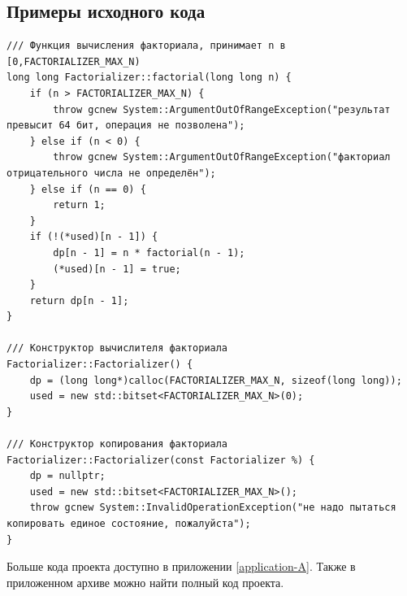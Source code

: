\subsection{Примеры исходного кода}
\begin{verbatim}
/// Функция вычисления факториала, принимает n в [0,FACTORIALIZER_MAX_N)
long long Factorializer::factorial(long long n) {
	if (n > FACTORIALIZER_MAX_N) {
		throw gcnew System::ArgumentOutOfRangeException("результат превысит 64 бит, операция не позволена");
	} else if (n < 0) {
		throw gcnew System::ArgumentOutOfRangeException("факториал отрицательного числа не определён");
	} else if (n == 0) {
		return 1;
	}
	if (!(*used)[n - 1]) {
		dp[n - 1] = n * factorial(n - 1);
		(*used)[n - 1] = true;
	}
	return dp[n - 1];
}

/// Конструктор вычислителя факториала
Factorializer::Factorializer() {
	dp = (long long*)calloc(FACTORIALIZER_MAX_N, sizeof(long long));
	used = new std::bitset<FACTORIALIZER_MAX_N>(0);
}

/// Конструктор копирования факториала
Factorializer::Factorializer(const Factorializer %) {
	dp = nullptr;
	used = new std::bitset<FACTORIALIZER_MAX_N>();
	throw gcnew System::InvalidOperationException("не надо пытаться копировать единое состояние, пожалуйста");
}
\end{verbatim}

Больше кода проекта доступно в приложении \ref{application-A}. Также в приложенном архиве можно найти полный код проекта.